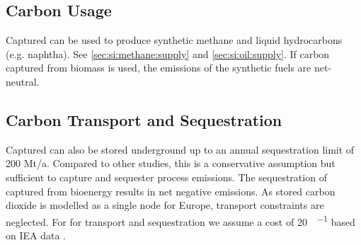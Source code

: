\subsection{Carbon Usage}

Captured \co can be used to produce synthetic methane and liquid hydrocarbons
(e.g. naphtha). See \cref{sec:si:methane:supply} and \cref{sec:si:oil:supply}.
If carbon captured from biomass is used, the \co emissions of the synthetic
fuels are net-neutral.

\subsection{Carbon Transport and Sequestration}

Captured \co can also be stored underground up to an annual sequestration limit
of 200 Mt\co/a. Compared to other studies, this is a conservative assumption but
sufficient to capture and sequester process emissions. The sequestration of
captured \co from bioenergy results in net negative emissions. As stored carbon
dioxide is modelled as a single node for Europe, transport constraints are
neglected. For for \co transport and sequestration we assume a cost of
\SI{20}{\sieuro\per\tco} based on IEA data .


